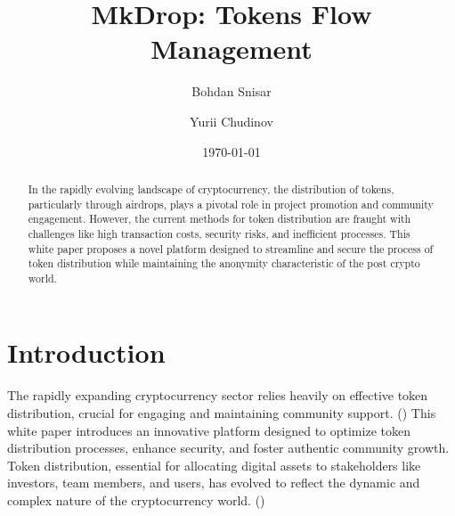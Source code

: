 \documentclass[12pt,oneside]{article}
\date{\small\today}
\title{%
  MkDrop: Tokens Flow Management\\
  \colorbox{mypink}{\small\sffamily\color{white}{White Paper}}}
\author{Bohdan Snisar \and Yurii Chudinov} %
\begin{document}
\raggedbottom

\maketitle
\begin{abstract}
  In the rapidly evolving landscape of cryptocurrency, the distribution of tokens, particularly through airdrops, 
  plays a pivotal role in project promotion and community engagement. However, the current methods for token 
  distribution   are fraught with challenges like high transaction costs, security risks, and inefficient processes. 
  This white paper proposes a novel platform designed to streamline and secure the process of token distribution 
  while maintaining the anonymity characteristic of the post crypto world.
\end{abstract}


\section{Introduction}

The rapidly expanding cryptocurrency sector relies heavily on effective token distribution,
crucial for engaging and maintaining community support. (\cite{ziegler2023navigating}) This white paper introduces an innovative 
platform designed to optimize token distribution processes, enhance security, and foster authentic 
community growth. Token distribution, essential for allocating digital assets to stakeholders like investors, 
team members, and users, has evolved to reflect the dynamic and complex nature of the cryptocurrency world. (\cite{Fan_2023})
\end{document}
